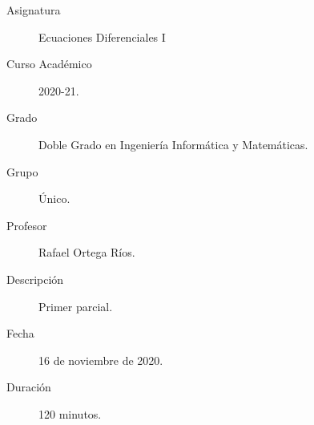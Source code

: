 \documentclass[12pt]{article}
\begin{document}

    
    

    \begin{description}
        \item[Asignatura] Ecuaciones Diferenciales I
        \item[Curso Académico] 2020-21.
        \item[Grado] Doble Grado en Ingeniería Informática y Matemáticas.
        \item[Grupo] Único.
        \item[Profesor] Rafael Ortega Ríos.
        \item[Descripción] Primer parcial.
        \item[Fecha] 16 de noviembre de 2020.
        \item[Duración] 120 minutos.
    
    \end{description}
    \newpage
\end{document}
